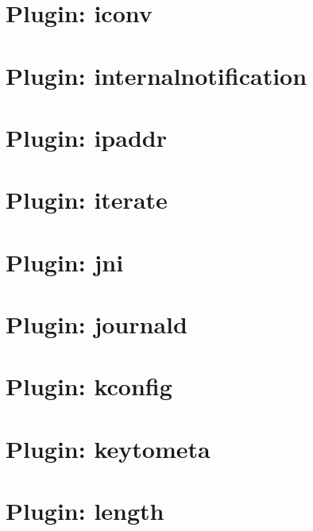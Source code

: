 \let\mypdfximage\pdfximage\def\pdfximage{\immediate\mypdfximage}\documentclass[twoside]{book}
\newcommand{\+}{\discretionary{\mbox{\scriptsize$\hookleftarrow$}}{}{}}
\begin{document}
\chapter{Plugin\+: iconv}
\label{md_src_plugins_iconv_README}

\chapter{Plugin\+: internalnotification}
\label{md_src_plugins_internalnotification_README}

\chapter{Plugin\+: ipaddr}
\label{md_src_plugins_ipaddr_README}

\chapter{Plugin\+: iterate}
\label{md_src_plugins_iterate_README}

\chapter{Plugin\+: jni}
\label{md_src_plugins_jni_README}

\chapter{Plugin\+: journald}
\label{md_src_plugins_journald_README}

\chapter{Plugin\+: kconfig}
\label{md_src_plugins_kconfig_README}

\chapter{Plugin\+: keytometa}
\label{md_src_plugins_keytometa_README}

\chapter{Plugin\+: length}
\label{md_src_plugins_length_README}

\end{document}

